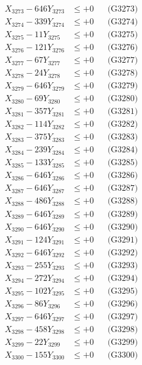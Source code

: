 \documentclass[a4paper,10pt]{article}
\begin{document}
{\begin{align}
X_{3273} - 646Y_{3273} &\leq +0 && \text{(G3273)} \\
X_{3274} - 339Y_{3274} &\leq +0 && \text{(G3274)} \\
X_{3275} - 11Y_{3275} &\leq +0 && \text{(G3275)} \\
X_{3276} - 121Y_{3276} &\leq +0 && \text{(G3276)} \\
X_{3277} - 67Y_{3277} &\leq +0 && \text{(G3277)} \\
X_{3278} - 24Y_{3278} &\leq +0 && \text{(G3278)} \\
X_{3279} - 646Y_{3279} &\leq +0 && \text{(G3279)} \\
X_{3280} - 69Y_{3280} &\leq +0 && \text{(G3280)} \\
\allowbreak
X_{3281} - 357Y_{3281} &\leq +0 && \text{(G3281)} \\
X_{3282} - 114Y_{3282} &\leq +0 && \text{(G3282)} \\
X_{3283} - 375Y_{3283} &\leq +0 && \text{(G3283)} \\
X_{3284} - 239Y_{3284} &\leq +0 && \text{(G3284)} \\
X_{3285} - 133Y_{3285} &\leq +0 && \text{(G3285)} \\
X_{3286} - 646Y_{3286} &\leq +0 && \text{(G3286)} \\
X_{3287} - 646Y_{3287} &\leq +0 && \text{(G3287)} \\
X_{3288} - 486Y_{3288} &\leq +0 && \text{(G3288)} \\
X_{3289} - 646Y_{3289} &\leq +0 && \text{(G3289)} \\
X_{3290} - 646Y_{3290} &\leq +0 && \text{(G3290)} \\
\allowbreak
X_{3291} - 124Y_{3291} &\leq +0 && \text{(G3291)} \\
X_{3292} - 646Y_{3292} &\leq +0 && \text{(G3292)} \\
X_{3293} - 255Y_{3293} &\leq +0 && \text{(G3293)} \\
X_{3294} - 272Y_{3294} &\leq +0 && \text{(G3294)} \\
X_{3295} - 102Y_{3295} &\leq +0 && \text{(G3295)} \\
X_{3296} - 86Y_{3296} &\leq +0 && \text{(G3296)} \\
X_{3297} - 646Y_{3297} &\leq +0 && \text{(G3297)} \\
X_{3298} - 458Y_{3298} &\leq +0 && \text{(G3298)} \\
X_{3299} - 22Y_{3299} &\leq +0 && \text{(G3299)} \\
X_{3300} - 155Y_{3300} &\leq +0 && \text{(G3300)} \\

\end{align}}
\end{document}
